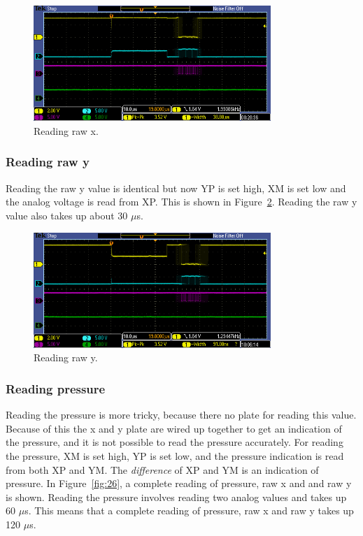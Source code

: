 \documentclass[12pt]{article}
\begin{document}
\begin{figure}[!ht]
\centering
\includegraphics[width=0.8\textwidth]{sample_x}
\caption{Reading raw x.}
\label{fig:21}
\end{figure}

\subsubsection{Reading raw y}
Reading the raw y value is identical but now YP is set high, XM is set low and the analog voltage is read from XP. This is shown in Figure~\ref{fig:22}. Reading the raw y value also takes up about 30 $\mu$s.

\begin{figure}[!ht]
\centering
\includegraphics[width=0.8\textwidth]{sample_y}
\caption{Reading raw y.}
\label{fig:22}
\end{figure}


\subsubsection{Reading pressure}
Reading the pressure is more tricky, because there no plate for reading this value. Because of this the x and y plate are wired up together to get an indication of the pressure, and it is not possible to read the pressure accurately. For reading the pressure, XM is set high, YP is set low, and the pressure indication is read from both XP and YM. The \textsl{difference} of XP and YM is an indication of pressure. In Figure~\ref{fig:26}, a complete reading of pressure, raw x and and raw y is shown. Reading the pressure involves reading two analog values and takes up 60 $\mu$s. This means that a complete reading of pressure, raw x and raw y takes up 120 $\mu$s.
\end{document}
